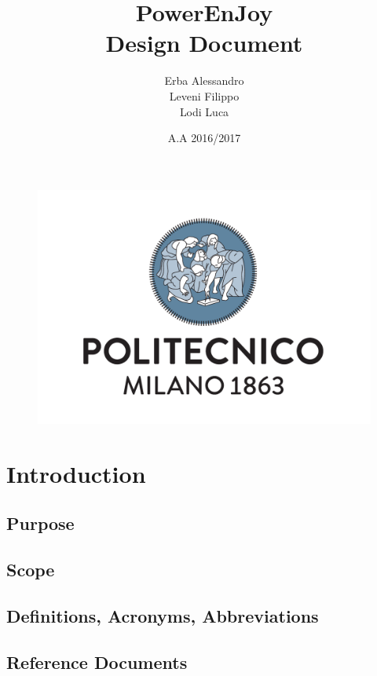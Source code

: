 \documentclass[english]{article}
\begin{document}
	\begin{figure}
		\centering
		\includegraphics[scale=0.5]{logo.pdf} 
	\end{figure}


	\title{PowerEnJoy\\
	Design Document\\
	}

	\date{A.A 2016/2017}
	
	\author{Erba Alessandro\\
	 Leveni Filippo\\
	 Lodi Luca}
	
	\maketitle
	\pagebreak{}

\tableofcontents{} \pagebreak{}
\section{Introduction}
	\subsection{Purpose}
	\subsection{Scope}
	\subsection{Definitions, Acronyms, Abbreviations}
	\subsection{Reference Documents}
\end{document}
